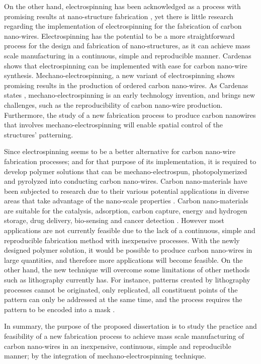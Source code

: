 On the other hand, electrospinning has been acknowledged as a process with promising results at nano-structure fabrication \cite{Boer2014}, yet there is little research regarding the implementation of electrospinning for the fabrication of carbon nano-wires. Electrospinning has the potential to be a more straightforward process for the design and fabrication of nano-structures, as it can achieve mass scale manufacturing in a continuous, simple and reproducible manner. Cardenas \cite{Cardenas2017} shows that electrospinning can be implemented with ease for carbon nano-wire synthesis. Mechano-electrospinning, a new variant of electrospinning shows promising results in the production of ordered carbon nano-wires. As Cardenas states \cite{Cardenas2017}, mechano-electrospinning is an early technology invention, and brings new challenges, such as the reproducibility of carbon nano-wire production. Furthermore, the study of a new fabrication process to produce carbon nanowires that involves mechano-electrospinning will enable spatial control of the structures' patterning.

Since electrospinning seems to be a better alternative for carbon nano-wire fabrication processes; and for that purpose of its implementation, it is required to develop polymer solutions that can be mechano-electrospun, photopolymerized and pyrolyzed into conducting carbon nano-wires. Carbon nano-materials have been subjected to research due to their various potential applications in diverse areas that take advantage of the nano-scale properties \cite{Siddiqui2019}. Carbon nano-materials are suitable for the catalysis, adsorption, carbon capture, energy and hydrogen storage, drug delivery, bio-sensing and cancer detection \cite{Siddiqui2019}. However most applications are not currently feasible due to the lack of a continuous, simple and reproducible fabrication method with inexpensive processes. With the newly designed polymer solution, it would be possible to produce carbon nano-wires in large quantities, and therefore more applications will become feasible. On the other hand, the new technique will overcome some limitations of other methods such as lithography currently has. For instance, patterns created by lithography processes cannot be originated, only replicated, all constituent points of the pattern can only be addressed at the same time, and the process requires the pattern to be encoded into a mask \cite{Landis2011}.

In summary, the purpose of the proposed dissertation is to study the practice and feasibility of a new fabrication process to achieve mass scale manufacturing of carbon nano-wires in an inexpensive, continuous, simple and reproducible manner; by the integration of mechano-electrospinning technique.






